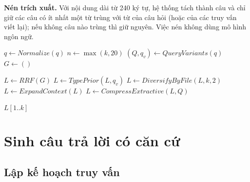 \bigbreak\noindent
\textbf{Nén trích xuất.} Với nội dung dài từ 240 ký tự, hệ thống tách thành câu và chỉ giữ các câu có ít nhất một từ trùng với từ của câu hỏi (hoặc của các truy vấn viết lại); nếu không câu nào trùng thì giữ nguyên. Việc nén không dùng mô hình ngôn ngữ.

\begin{algorithm}
\SetAlgoLined
\DontPrintSemicolon
\caption{Thuật toán truy xuất lai đa phương thức}\label{alg:truy-xuat}


$q \gets Normalize(q)$ \;
$n \gets \max(k, 20)$ \;
$(Q, q_v) \gets QueryVariants(q)$ 
$G \gets ()$ \;




$L \gets RRF(G)$ \;
$L \gets TypePrior(L, q_v)$ 
$L \gets DiversifyByFile(L, k, 2)$ \;
$L \gets ExpandContext(L)$ \;
$L \gets CompressExtractive(L, Q)$ \;

\Return $L[1..k]$
\end{algorithm}


\section{Sinh câu trả lời có căn cứ}\label{sec:sinh}

\subsection{Lập kế hoạch truy vấn}

